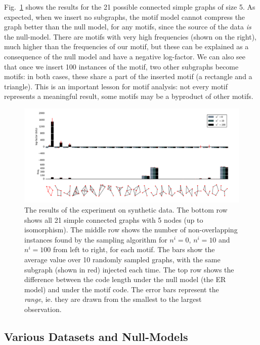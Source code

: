 Fig.~\ref{figure:plot-synthetic} shows the results for the 21 possible connected simple graphs of size 5. As expected, when we insert no subgraphs, the motif model cannot compress the graph better than the null model, for any motifs, since the source of the data \emph{is} the null-model. There are motifs with very high frequencies (shown on the right), much higher than the frequencies of our motif, but these can be explained as a consequence of the null model and have a negative log-factor. We can also see that once we insert 100 instances of the motif, two other subgraphs become motifs: in both cases, these share a part of the inserted motif (a rectangle and a triangle). This is an important lesson for motif analysis: not every motif represents a meaningful result, some motifs may be a byproduct of other motifs. 

\begin{figure}[htb]
  \includegraphics[width=\textwidth]{./images/synthetic-plot.pdf}
  \caption{\small The results of the experiment on synthetic data. The bottom row shows all 21 simple connected graphs with 5 nodes (up to isomorphism). The middle row shows the number of non-overlapping instances found by the sampling algorithm for $n^i = 0$, $n^i=10$ and $n^i=100$ from left to right, for each motif. The bars show the average value over 10 randomly sampled graphs, with the same subgraph (shown in red) injected each time. The top row shows the difference between  the code length under the null model (the ER model) and under the motif code. The error bars represent the \emph{range}, ie. they are drawn from the smallest to the largest observation.}
  \label{figure:plot-synthetic}
\end{figure}

\subsection*{Various Datasets and Null-Models}
\label{section:various}

